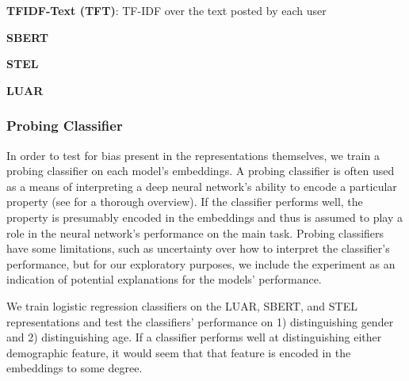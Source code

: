 \noindent \textbf{TFIDF-Text (TFT)}:
TF-IDF over the text posted by each user

\noindent \textbf{SBERT} \cite{reimers2019sentencebert}

\noindent \textbf{STEL} \cite{wegmann2021capture}

\noindent \textbf{LUAR} \cite{riverastao2021learning}


\subsubsection{Probing Classifier}
In order to test for bias present in the representations themselves, we train a probing classifier on each model's embeddings. A probing classifier is often used as a means of interpreting a deep neural network's ability to encode a particular property (see \citet{belinkov2022} for a thorough overview). If the classifier performs well, the property is presumably encoded in the embeddings and thus is assumed to play a role in the neural network's performance on the main task. Probing classifiers have some limitations, such as uncertainty over how to interpret the classifier's performance, %
but for our exploratory purposes, we include the experiment as an indication of potential explanations for the models' performance.

We train logistic regression classifiers on the LUAR, SBERT, and STEL representations and test the classifiers' performance on 1) distinguishing gender and 2) distinguishing age. If a classifier performs well at distinguishing either demographic feature, it would seem that that feature is encoded in the embeddings to some degree. 

